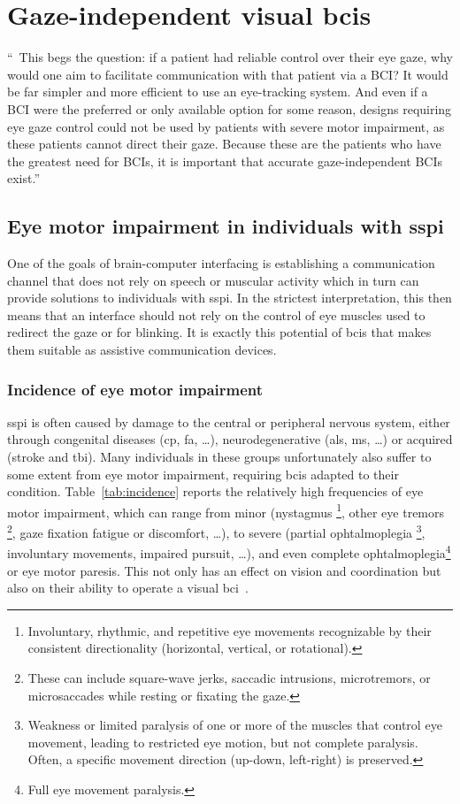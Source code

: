 \chapter{Gaze-independent visual \acsp{bci}}
\label{sec:gaze-independent}
\epigraph{%
  ``\elide\ This begs the question: if a patient had reliable control
  over their eye gaze, why would one aim to facilitate communication with that
  patient via a BCI? It would be far simpler and more efficient to use an
  eye-tracking system.
  And even if a BCI were the preferred or only available option for some reason,
  designs requiring eye gaze control could not be used
  by patients with severe motor impairment, as these patients
  cannot direct their gaze.
  Because these are the patients who have the greatest need for BCIs, it is
  important that accurate gaze-independent BCIs exist.''
}{%
  \textcite{Egan2017}
}


\section{Eye motor impairment in individuals with \acl{sspi}}%
\label{sec:gaze-dependence}

One of the goals of brain-computer interfacing is establishing a communication
channel that does not rely on speech or muscular activity which in turn can
provide solutions to individuals with \ac{sspi}.
In the strictest interpretation, this then means that an interface should not
rely on the control of eye muscles used to redirect the gaze or for blinking.
It is exactly this potential of \acp{bci} that makes them suitable as assistive
communication devices.

\subsection{Incidence of eye motor impairment}
\Ac{sspi} is often caused by damage to the central or peripheral nervous
system, either through congenital diseases (\ac{cp}, \ac{fa}, \ldots),
neurodegenerative (\ac{als}, \ac{ms}, \ldots) or acquired (stroke and
\ac{tbi}).
Many individuals in these groups unfortunately also suffer to
some extent from eye motor impairment, requiring \ac{bci}s adapted to their condition.
Table~\ref{tab:incidence} reports the relatively high frequencies of
eye motor impairment, which can range from minor (nystagmus
\footnote{%
Involuntary, rhythmic, and repetitive eye movements recognizable by their
consistent directionality (horizontal, vertical, or rotational).
}, other eye tremors
\footnote{%
These can include square-wave jerks, saccadic intrusions, microtremors, or
microsaccades while resting or fixating the gaze.
}, gaze fixation fatigue or discomfort, \ldots), to severe (partial ophtalmoplegia
\footnote{%
Weakness or limited paralysis of one or more of the muscles that control eye
movement, leading to restricted eye motion, but not complete paralysis.
Often, a specific movement direction (up-down, left-right) is preserved.
}, involuntary movements, impaired pursuit, \ldots), and even complete
ophtalmoplegia\footnote{Full eye movement paralysis.} or eye motor paresis.
This not only has an effect on vision and coordination but also
on their ability to operate a visual \ac{bci}~\cite{FriedOken2020}.

